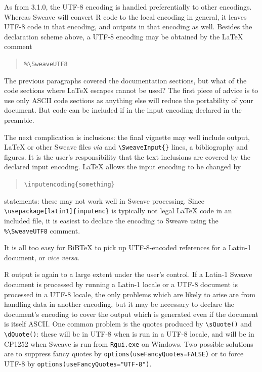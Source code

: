 \documentclass[a4paper]{article}
\begin{document}
As from \R{} 3.1.0, the UTF-8 encoding is handled preferentially to
other encodings.  Whereas Sweave will convert R code to the local
encoding in general, it leaves UTF-8 code in that encoding, and
outputs in that encoding as well.  Besides the declaration scheme
above, a UTF-8 encoding may be obtained by the \LaTeX{} comment
\begin{quote}
  \verb|%\SweaveUTF8|
\end{quote}

The previous paragraphs covered the documentation sections, but what of
the code sections where \LaTeX{} escapes cannot be used?  The first
piece of advice is to use only ASCII code sections as anything else
will reduce the portability of your document.  But \R{} code can be
included if in the input encoding declared in the preamble.

The next complication is inclusions: the final vignette may well
include \R{} output, \LaTeX{} or other Sweave files \emph{via}
\verb|| and \verb|\SweaveInput{}| lines, a bibliography and
figures. It is the user's responsibility that the text inclusions are
covered by the declared input encoding.  \LaTeX{} allows the input
encoding to be changed by
\begin{quote}
  \verb|\inputencoding{something}|
\end{quote}
statements: these may not work well in Sweave processing.  Since
\verb|\usepackage[latin1]{inputenc}| is typically not legal \LaTeX{} code
in an included file, it is easiest to declare the encoding to Sweave
using the \verb|%\SweaveUTF8| comment.

It is all too easy for BiBTeX to pick up UTF-8-encoded references for
a Latin-1 document, or \emph{vice versa}.

R output is again to a large extent under the user's control.  If a
Latin-1 Sweave document is processed by \R{} running a Latin-1 locale or
a UTF-8 document is processed in a UTF-8 locale, the only problems
which are likely to arise are from handling data in another encoding,
but it may be necessary to declare the document's encoding to cover
the \R{} output which is generated even if the document is itself ASCII.
One common problem is the quotes produced by \verb|\sQuote()| and
\verb|\dQuote()|: these will be in UTF-8 when \R{} is run in a UTF-8
locale, and will be in CP1252 when Sweave is run from \verb|Rgui.exe|
on Windows.  Two possible solutions are to suppress fancy quotes by
\verb|options(useFancyQuotes=FALSE)| or to force UTF-8 by
\verb|options(useFancyQuotes="UTF-8")|.
\end{document}
